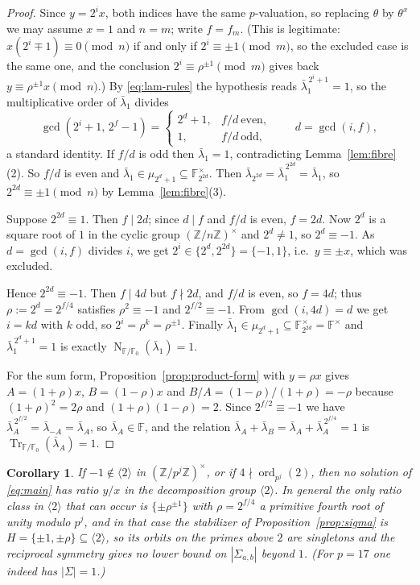 \documentclass[a4paper]{article}
\newtheorem{corollary}[theorem]{Corollary}
\newcommand{\F}{\mathbb{F}}
\newcommand{\Z}{\mathbb{Z}}
\newcommand{\ord}[2][]{\operatorname{ord}_{#1}\!\left(#2\right)}
\newcommand{\abs}[1]{\left|#1\right|}
\DeclareMathOperator{\Tr}{Tr}
\DeclareMathOperator{\Nm}{N}
\begin{document}
\begin{proof}
	Since $y=2^{i}x$, both indices have the same $p$-valuation, so
	replacing $\theta$ by $\theta^{x}$ we may assume $x=1$ and $n=m$; write
	$f=f_m$.  (This is legitimate: $x(2^{i}\mp1)\equiv0\pmod n$ if and only
	if $2^{i}\equiv\pm1\pmod m$, so the excluded case is the same one, and
	the conclusion $2^{i}\equiv\rho^{\pm1}\pmod m$ gives back
	$y\equiv\rho^{\pm1}x\pmod n$.)
	By \eqref{eq:lam-rules} the hypothesis reads
	$\bar\lambda_1^{\,2^{i}+1}=1$, so the multiplicative order of
	$\bar\lambda_1$ divides
	\[
		\gcd\!\left(2^{i}+1,\,2^{f}-1\right)=
		\begin{cases}
			2^{d}+1, & f/d\ \text{even},\\
			1,       & f/d\ \text{odd},
		\end{cases}
		\qquad d=\gcd(i,f),
	\]
	a standard identity.
	If $f/d$ is odd then $\bar\lambda_1=1$, contradicting
	Lemma~\ref{lem:fibre}(2).
	So $f/d$ is even and $\bar\lambda_1\in\mu_{2^{d}+1}\subseteq
	\F_{2^{2d}}^{\times}$.
	Then $\bar\lambda_{2^{2d}}=\bar\lambda_1^{\,2^{2d}}=\bar\lambda_1$, so
	$2^{2d}\equiv\pm1\pmod n$ by Lemma~\ref{lem:fibre}(3).

	Suppose $2^{2d}\equiv1$.  Then $f\mid2d$; since $d\mid f$ and $f/d$ is
	even, $f=2d$.  Now $2^{d}$ is a square root of $1$ in the cyclic group
	$(\Z/n\Z)^{\times}$ and $2^{d}\ne1$, so $2^{d}\equiv-1$.  As
	$d=\gcd(i,f)$ divides $i$, we get $2^{i}\in\{2^{d},2^{2d}\}=\{-1,1\}$,
	i.e.\ $y\equiv\pm x$, which was excluded.

	Hence $2^{2d}\equiv-1$.  Then $f\mid4d$ but $f\nmid2d$, and $f/d$ is
	even, so $f=4d$; thus $\rho:=2^{d}=2^{f/4}$ satisfies
	$\rho^{2}\equiv-1$ and $2^{f/2}\equiv-1$.
	From $\gcd(i,4d)=d$ we get $i=kd$ with $k$ odd, so
	$2^{i}=\rho^{k}=\rho^{\pm1}$.
	Finally $\bar\lambda_1\in\mu_{2^{d}+1}\subseteq\F_{2^{2d}}^{\times}
	=\F^{\times}$ and $\bar\lambda_1^{\,2^{d}+1}=1$ is exactly
	$\Nm_{\F/\F_0}(\bar\lambda_1)=1$.

	For the sum form, Proposition~\ref{prop:product-form} with $y=\rho x$
	gives $A=(1+\rho)x$, $B=(1-\rho)x$ and
	$B/A=(1-\rho)/(1+\rho)=-\rho$ because $(1+\rho)^{2}=2\rho$ and
	$(1+\rho)(1-\rho)=2$.
	Since $2^{f/2}\equiv-1$ we have
	$\bar\lambda_A^{\,2^{f/2}}=\bar\lambda_{-A}=\bar\lambda_A$, so
	$\bar\lambda_A\in\F$, and the relation
	$\bar\lambda_A+\bar\lambda_B=\bar\lambda_A+\bar\lambda_A^{\,2^{f/4}}=1$
	is $\Tr_{\F/\F_0}(\bar\lambda_A)=1$.
\end{proof}

\begin{corollary}\label{cor:frobratio}
	If $-1\notin\langle2\rangle$ in $(\Z/p^{j}\Z)^{\times}$, or if
	$4\nmid\ord[p^j]{2}$, then no solution of \eqref{eq:main} has ratio
	$y/x$ in the decomposition group $\langle2\rangle$.
	In general the only ratio class in $\langle2\rangle$ that can occur is
	$\{\pm\rho^{\pm1}\}$ with $\rho=2^{f/4}$ a primitive fourth root of
	unity modulo $p^{j}$, and in that case the stabilizer of
	Proposition~\ref{prop:sigma} is $H=\{\pm1,\pm\rho\}\subseteq
	\langle2\rangle$, so its orbits on the primes above $2$ are singletons
	and the reciprocal symmetry gives no lower bound on
	$\abs{\Sigma_{a,b}}$ beyond $1$.
	(For $p=17$ one indeed has $\abs{\Sigma}=1$.)
\end{corollary}
\end{document}
